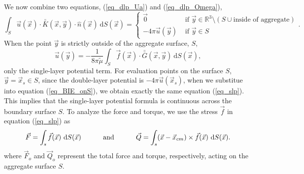 We now combine two equations, (\ref{eq_dlp_Ua}) and (\ref{eq_dlp_Omega}),
\begin{equation}
	\int_S \vec{u} ( \vec{x}) \cdot \bar{\bar{K}}(\vec{x},\vec{y}) \cdot \hat{n} ( \vec{x})
	\ \text{d}S(\vec{x})
	 = 
	 \begin{cases}
	  \vec{0}& \text{ if } \vec{y} \in \mathbb{R}^3  \setminus \left( S \cup {\text{inside of aggregate}}\right)
	  \\ 
	 - 4\pi \vec{u}(\vec{y}) & \text{ if } \vec{y} \in S 
	 \end{cases}.
	\label{eq_dlp_val_out}
\end{equation}
When the point $\vec{y}$ is strictly outside of the aggregate surface, $S$,
 \begin{equation}
    \vec{u}(\vec{y}) = - \frac{1}{8 \pi \tilde{\mu}} \int_S  \vec{f}(\vec{x}) \cdot \bar{\bar{G}}(\vec{x},\vec{y}) \ \text{d}S(\vec{x}) ,
 \label{eq_slp}
 \end{equation}
 only the single-layer potential term.
For evaluation points on the surface $S$, 
$\vec{y} = \vec{x}_s \in S$, 
since the double-layer potential is $- 4 \pi \vec{u}(\vec{x}_s)$, when we substitue into equation (\ref{eq_BIE_onS}), 
we obtain exactly the same equation (\ref{eq_slp}). This implies that the single-layer potential formula is continuous across the boundary surface $S$.
To analyze the force and torque, we use the stress $\vec{f}$ in equation (\ref{eq_slp}) as
\begin{equation}
	\vec{F} = \int_s \vec{f}(\vec{x}) \  \text{d}S(\vec{x}) \hspace{1 cm} \text{ and } \hspace{1 cm}   \vec{Q} = \int_s (\vec{x} - \vec{x}_{cm}) \times \vec{f}(\vec{x})  \ \text{d}S(\vec{x}).
	\label{eq_total_FT}
\end{equation}
 where $\vec{F}_o$ and $\vec{Q}_o$ represent the total force and torque, respectively, acting on the aggregate surface $S$.
%

